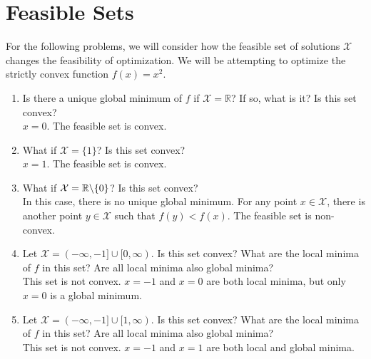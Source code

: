 \documentclass{article}
\begin{document}
\section{Feasible Sets}
For the following problems, we will consider how the feasible set of solutions $\mathcal{X}$ changes the feasibility of optimization. We will be attempting to optimize the strictly convex function $f(x) = x^2$.
\begin{enumerate}[label=\arabic*.]
\item Is there a unique global minimum of $f$ if $\mathcal{X} = \mathbb{R}$? If so, what is it? Is this set convex? \\
{\color{blue} $x = 0$. The feasible set is convex.}
\item What if $\mathcal{X} = \{ 1\}$? Is this set convex? \\
{\color{blue} $x = 1$. The feasible set is convex.}
\item What if $\mathcal{X} = \mathbb{R} \char`\\ \{ 0 \}$? Is this set convex? \\
{\color{blue} In this case, there is no unique global minimum. For any point $x \in \mathcal{X}$, there is another point $y \in \mathcal{X}$ such that $f(y) < f(x)$. The feasible set is non-convex.}
\item Let $\mathcal{X} = (-\infty, -1] \cup [0, \infty )$. Is this set convex? What are the local minima of $f$ in this set? Are all local minima also global minima? \\
{\color{blue} This set is not convex. $x = -1$ and $x = 0$ are both local minima, but only $x = 0$ is a global minimum.}
\item Let $\mathcal{X} = (-\infty, -1] \cup [1, \infty )$. Is this set convex? What are the local minima of $f$ in this set? Are all local minima also global minima? \\
{\color{blue} This set is not convex. $x = -1$ and $x = 1$ are both local and global minima.}
\end{enumerate}
\end{document}
